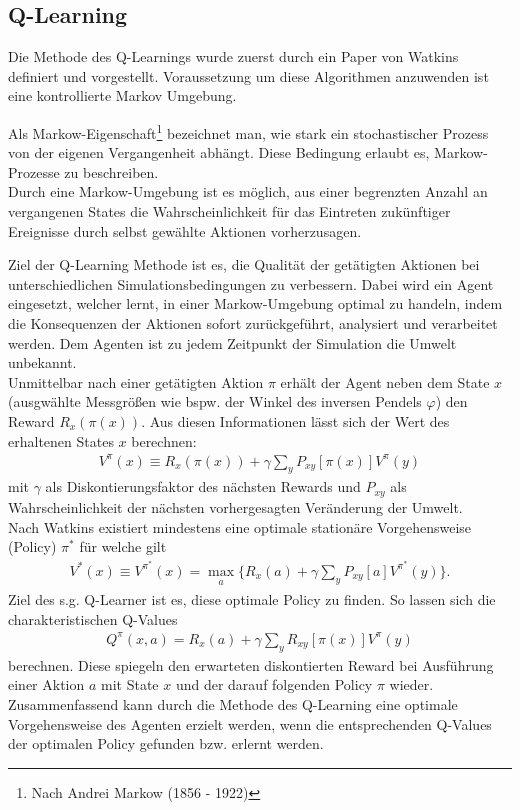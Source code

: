 	\subsection{Q-Learning}
	\label{subsec:rl_qlearning}
		Die Methode des Q-Learnings wurde zuerst durch ein Paper von Watkins \cite{Watkins1992} definiert und vorgestellt. Voraussetzung um diese Algorithmen anzuwenden ist eine kontrollierte Markov Umgebung.
		\begin{remark}
			Als Markow-Eigenschaft\footnote{Nach Andrei Markow (1856 - 1922)} bezeichnet man, wie stark ein stochastischer Prozess von der eigenen Vergangenheit abhängt. Diese Bedingung erlaubt es, Markow-Prozesse zu beschreiben.\\
			Durch eine Markow-Umgebung ist es möglich, aus einer begrenzten Anzahl an vergangenen States die Wahrscheinlichkeit für das Eintreten zukünftiger Ereignisse durch selbst gewählte Aktionen vorherzusagen. \cite{SilverRL}
		\end{remark}
		Ziel der Q-Learning Methode ist es, die Qualität der getätigten Aktionen bei unterschiedlichen Simulationsbedingungen zu verbessern. Dabei wird ein Agent eingesetzt, welcher lernt, in einer Markow-Umgebung optimal zu handeln, indem die Konsequenzen der Aktionen sofort zurückgeführt, analysiert und verarbeitet werden. Dem Agenten ist zu jedem Zeitpunkt der Simulation die Umwelt unbekannt.\\
		Unmittelbar nach einer getätigten Aktion $\pi$ erhält der Agent neben dem State $x$ (ausgwählte Messgrößen wie bspw. der Winkel des inversen Pendels $\varphi$) den Reward $R_x(\pi(x))$. Aus diesen Informationen lässt sich der Wert des erhaltenen States $x$ berechnen:
		\begin{align}
			V^\pi(x) \equiv R_x(\pi(x)) + \gamma \sum_{y}P_{xy}[\pi(x)]V^\pi(y)
		\end{align}
		mit $\gamma$ als Diskontierungsfaktor des nächsten Rewards und $P_{xy}$ als Wahrscheinlichkeit der nächsten vorhergesagten Veränderung der Umwelt.\\
		Nach Watkins existiert mindestens eine optimale stationäre Vorgehensweise (\glqq Policy\grqq) $\pi^*$ für welche gilt
		\begin{align}
			V^*(x) \equiv V^{\pi^*}(x) = \max_{\substack{a}} \bigg\{R_x(a) + \gamma \sum_{y}P_{xy}[a]V^{\pi^*}(y)\bigg\}.
		\end{align}
		Ziel des s.g. \glqq Q-Learner\grqq{} ist es, diese optimale Policy zu finden. So lassen sich die charakteristischen Q-Values
		\begin{align}
			Q^\pi(x,a) = R_x(a) + \gamma \sum_{y}R_{xy}[\pi(x)]V^\pi(y)
		\end{align}
		berechnen. Diese spiegeln den erwarteten diskontierten Reward bei Ausführung einer Aktion $a$ mit State $x$ und der darauf folgenden Policy $\pi$ wieder. Zusammenfassend kann durch die Methode des Q-Learning eine optimale Vorgehensweise des Agenten erzielt werden, wenn die entsprechenden Q-Values der optimalen Policy gefunden bzw. erlernt werden.
